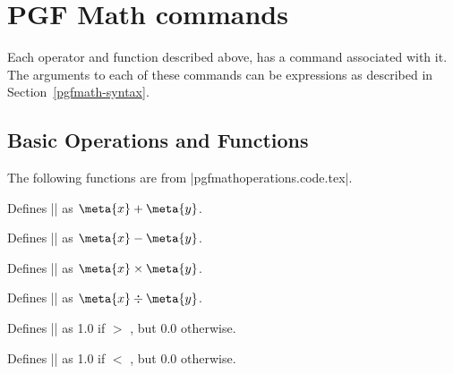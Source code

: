 %
%
%

\section{PGF Math commands}

\label{pgfmath-commands}

Each operator and function described above, has a \pgfname{} command
associated with it. The arguments to each of these commands can be
expressions as described in Section~\ref{pgfmath-syntax}.
 
\subsection{Basic Operations and Functions}

\label{pgfmath-operations}

The following functions are from |pgfmathoperations.code.tex|.

\begin{command}{\pgfmathadd{}}  
	Defines |\pgfmathresult| as $\meta{x}+\meta{y}$.
\end{command}

\begin{command}{\pgfmathsubtract{}}      
	Defines |\pgfmathresult| as $\meta{x}-\meta{y}$.                                       
\end{command}

\begin{command}{\pgfmathmultiply{}}      
	Defines |\pgfmathresult| as $\meta{x}\times\meta{y}$.                                
\end{command}

\begin{command}{\pgfmathdivide{}}        
	Defines |\pgfmathresult| as $\meta{x}\div\meta{y}$.                                 
\end{command}

\begin{command}{\pgfmathgreaterthan{}}   
	Defines |\pgfmathresult| as 1.0 if  $>$ , but 0.0 otherwise.                 
\end{command}

\begin{command}{\pgfmathlessthan{}} 
	Defines |\pgfmathresult| as 1.0 if  $<$ , but 0.0 otherwise.             
\end{command}
	
